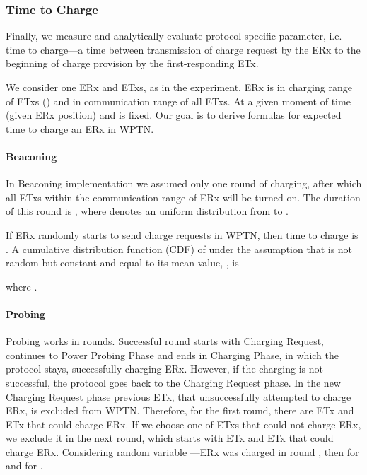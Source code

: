 \documentclass[11pt,draftclsnofoot,journal,onecolumn]{IEEEtran}
\begin{document}
\newcommand{\tOptB}{T^{\text{B}}_{\text{opt}}}
\newcommand{\tPesB}{T^{\text{B}}_{\text{pes}}}
\newcommand{\tOptBavg}{\overline{T}^{\text{B}}_{\text{opt}}}
\newcommand{\tPesBavg}{\overline{T}^{\text{B}}_{\text{pes}}}
\newcommand{\tStartB}{T^{\text{B}}_{\text{start}}}
\newcommand{\tOptP}{T^{\text{P}}_{\text{opt}}}
\newcommand{\tPesP}{T^{\text{P}}_{\text{pes}}}
\newcommand{\tOptPavg}{\overline{T}^{\text{P}}_{\text{opt}}}
\newcommand{\tPesPavg}{\overline{T}^{\text{P}}_{\text{pes}}}
\newcommand{\tStartP}{T^{\text{P}}_{\text{start}}}

\subsubsection{Time to Charge}
\label{sec:time_to_charge_metric}

Finally, we measure and analytically evaluate protocol-specific parameter, i.e. time to charge---a time between transmission of charge request by the ERx to the beginning of charge provision by the first-responding ETx. 

We consider one ERx and  ETxs, as in the experiment. ERx is in charging range of  ETxs () and in communication range of all  ETxs. At a given moment of time (given ERx position)  and  is fixed. Our goal is to derive formulas for expected time to charge an ERx in WPTN.

\paragraph{Beaconing}

In Beaconing implementation we assumed only one round of charging, after which all ETxs within the communication range of ERx will be turned on. The duration of this round is , where  denotes an uniform distribution from  to .

If ERx randomly starts to send charge requests in WPTN, then time to charge is . A cumulative distribution function (CDF) of  under the assumption that  is not random but constant and equal to its mean value, , is

where .

\paragraph{Probing}

Probing works in rounds. Successful round starts with Charging Request, continues to Power Probing Phase and ends in Charging Phase, in which the protocol stays, successfully charging ERx. However, if the charging is not successful, the protocol goes back to the Charging Request phase. In the new Charging Request phase previous ETx, that unsuccessfully attempted to charge ERx, is excluded from WPTN. Therefore, for the first round, there are  ETx and  ETx that could charge ERx. If we choose one of  ETxs that could not charge ERx, we exclude it in the next round, which starts with  ETx and  ETx that could charge ERx. Considering random variable ---ERx was charged in round , then  for  and  for .
\end{document}
